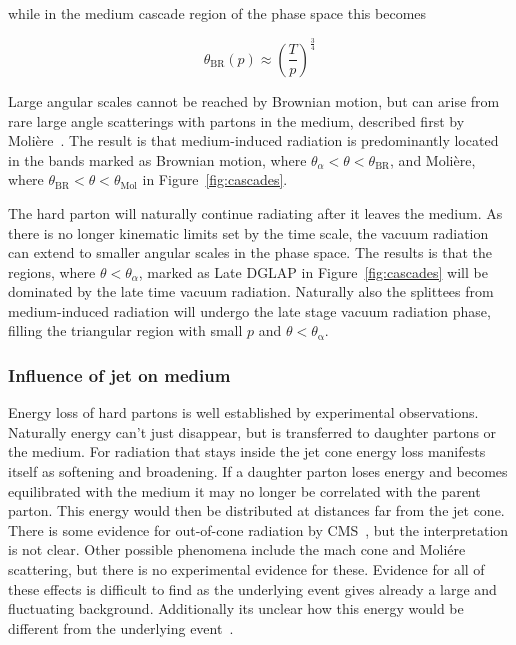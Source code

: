 \noindent while in the medium cascade region of the phase space this becomes

\begin{equation}
\theta_\mathrm{BR}\left(p\right) \approx \left(\frac{T}{p}\right)^{\frac{3}{4}}
\end{equation}

\noindent Large angular scales cannot be reached by Brownian motion, but can arise from rare large angle scatterings with partons in the medium, described first by Molière~\cite{Moliere:1947zza}. The result is that medium-induced radiation is predominantly located in the bands marked as Brownian motion, where $\theta_\alpha < \theta < \theta_\mathrm{BR}$, and Moli\`ere, where $\theta_\mathrm{BR} < \theta < \theta_\mathrm{Mol}$ in Figure~\ref{fig:cascades}. 

The hard parton will naturally continue radiating after it leaves the medium. As there is no longer kinematic limits set by the time scale, the vacuum radiation can extend to smaller angular scales in the phase space. The results is that the regions, where $\theta<\theta_\alpha$, marked as Late DGLAP in Figure~\ref{fig:cascades} will be dominated by the late time vacuum radiation. Naturally also the splittees from medium-induced radiation will undergo the late stage vacuum radiation phase, filling the triangular region with small $p$ and $\theta < \theta_\mathrm{\alpha}$.



\subsubsection*{Influence of jet on medium}
Energy loss of hard partons is well established by experimental observations. Naturally energy can't just disappear, but is transferred to daughter partons or the medium. For radiation that stays inside the jet cone energy loss manifests itself as softening and broadening. If a daughter parton loses energy and becomes equilibrated with the medium it may no longer be correlated with the parent parton. This energy would then be distributed at distances far from the jet cone. There is some evidence for out-of-cone radiation by CMS~\cite{Chatrchyan:2011sx}, but the interpretation is not clear. Other possible phenomena include the mach cone and Moliére scattering, but there is no experimental evidence for these. Evidence for all of these effects is difficult to find as the underlying event gives already a large and fluctuating background. Additionally its unclear how this energy would be different from the underlying event~\cite{Connors:2017ptx}.
